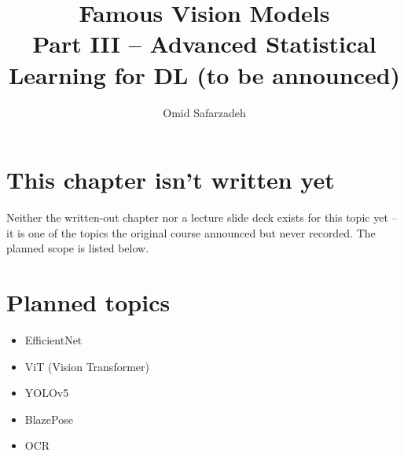 \documentclass[11pt]{article}
\title{Famous Vision Models \\ \large Part III -- Advanced Statistical Learning for DL (to be announced)}
\author{Omid Safarzadeh}
\date{}
\begin{document}
\maketitle

\section*{This chapter isn't written yet}
Neither the written-out chapter nor a lecture slide deck exists for this
topic yet -- it is one of the topics the original course announced but
never recorded. The planned scope is listed below.


\section*{Planned topics}
\begin{itemize}
  \item EfficientNet
  \item ViT (Vision Transformer)
  \item YOLOv5
  \item BlazePose
  \item OCR
\end{itemize}
\end{document}
